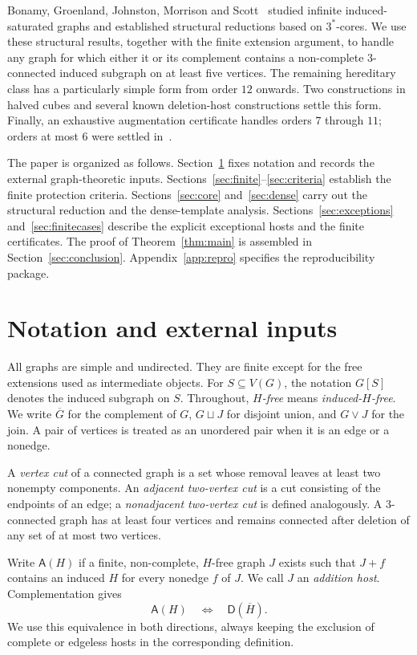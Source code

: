 \documentclass[11pt,reqno]{amsart}
\theoremstyle{definition}
\theoremstyle{remark}
\newcommand{\comp}[1]{\overline{#1}}
\newcommand{\Dsat}{\mathsf{D}}
\newcommand{\Asat}{\mathsf{A}}
\begin{document}
Bonamy, Groenland, Johnston, Morrison and Scott~\cite{BGJMS} studied infinite induced-saturated graphs and established structural reductions based on $3^{*}$-cores. We use these structural results, together with the finite extension argument, to handle any graph for which either it or its complement contains a non-complete $3$-connected induced subgraph on at least five vertices. The remaining hereditary class has a particularly simple form from order $12$ onwards. Two constructions in halved cubes and several known deletion-host constructions settle this form. Finally, an exhaustive augmentation certificate handles orders $7$ through $11$; orders at most $6$ were settled in~\cite{FHHS}.

The paper is organized as follows. Section~\ref{sec:prelim} fixes notation and records the external graph-theoretic inputs. Sections~\ref{sec:finite}--\ref{sec:criteria} establish the finite protection criteria. Sections~\ref{sec:core} and~\ref{sec:dense} carry out the structural reduction and the dense-template analysis. Sections~\ref{sec:exceptions} and~\ref{sec:finitecases} describe the explicit exceptional hosts and the finite certificates. The proof of Theorem~\ref{thm:main} is assembled in Section~\ref{sec:conclusion}. Appendix~\ref{app:repro} specifies the reproducibility package.

\section{Notation and external inputs}\label{sec:prelim}

All graphs are simple and undirected. They are finite except for the free extensions used as intermediate objects. For $S\subseteq V(G)$, the notation $G[S]$ denotes the induced subgraph on $S$. Throughout, \emph{$H$-free} means \emph{induced-$H$-free}. We write $\comp G$ for the complement of $G$, $G\sqcup J$ for disjoint union, and $G\vee J$ for the join. A pair of vertices is treated as an unordered pair when it is an edge or a nonedge.

A \emph{vertex cut} of a connected graph is a set whose removal leaves at least two nonempty components. An \emph{adjacent two-vertex cut} is a cut consisting of the endpoints of an edge; a \emph{nonadjacent two-vertex cut} is defined analogously. A $3$-connected graph has at least four vertices and remains connected after deletion of any set of at most two vertices.

Write $\Asat(H)$ if a finite, non-complete, $H$-free graph $J$ exists such that $J+f$ contains an induced $H$ for every nonedge $f$ of $J$. We call $J$ an \emph{addition host}. Complementation gives
\begin{equation}\label{eq:duality}
 \Asat(H)\quad\Longleftrightarrow\quad\Dsat(\comp H).
\end{equation}
We use this equivalence in both directions, always keeping the exclusion of complete or edgeless hosts in the corresponding definition.
\end{document}
